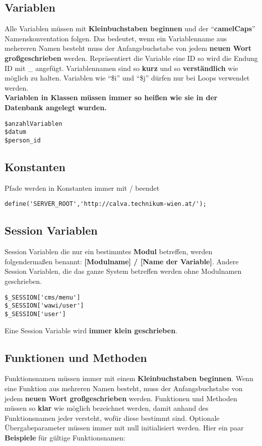 \subsection{Variablen}
Alle Variablen m\"ussen mit {\bf Kleinbuchstaben beginnen} und der "`{\bf camelCaps}"' Namenskonventation folgen. Das bedeutet, wenn ein Variablenname aus mehereren
Namen besteht muss der Anfangsbuchstabe von jedem {\bf neuen Wort gro\ss{}geschrieben} werden. Repr\"{a}sentiert die Variable eine ID so wird die Endung ID mit \_ angef\"ugt. 
Variablennamen sind so {\bf kurz} und so {\bf verst\"andlich} wie m\"oglich
zu halten. Variablen wie "`\$i"' und "`\$j"' d\"urfen nur bei Loops verwendet werden.\\
{\bf Variablen in Klassen m\"ussen immer so hei\ss{}en wie sie in der Datenbank angelegt wurden.}
\begin{verbatim}
$anzahlVariablen
$datum
$person_id
\end{verbatim}

\subsection{Konstanten}
Pfade werden in Konstanten immer mit / beendet

\begin{verbatim}
define('SERVER_ROOT','http://calva.technikum-wien.at/');
\end{verbatim}

\subsection{Session Variablen}
Session Variablen die nur ein bestimmtes {\bf Modul} betreffen, werden folgenderma\ss en benannt: 
{\bf [Modulname] / [Name der Variable]}. Andere Session Variablen, die das ganze System betreffen werden ohne Modulnamen geschrieben. 
\begin{verbatim}
$_SESSION['cms/menu']
$_SESSION['wawi/user']
$_SESSION['user']
\end{verbatim}
Eine Session Variable wird {\bf immer klein geschrieben}. 

\subsection{Funktionen und Methoden}
Funktionsnamen m\"ussen immer mit einem {\bf Kleinbuchstaben beginnen}. Wenn eine Funktion aus mehreren Namen besteht, muss der Anfangsbuchstabe von jedem 
{\bf neuen Wort gro\ss geschrieben} werden. Funktionen und Methoden m\"ussen so {\bf klar} wie m\"oglich bezeichnet werden, damit anhand des Funktionsnamen jeder
versteht, wof\"ur diese bestimmt sind. Optionale \"Ubergabeparameter m\"ussen immer mit null initialisiert werden. \newline
Hier ein paar {\bf Beispiele} f\"ur g\"ultige Funktionsnamen:

